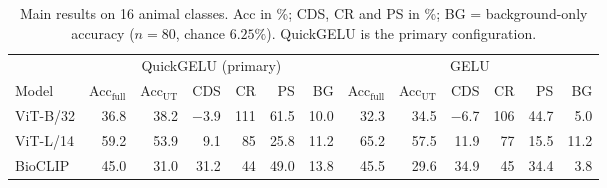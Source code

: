 \begin{table}[t]
\caption{Main results on 16 animal classes. Acc in \%; CDS, CR and PS in \%; BG = background-only accuracy ($n{=}80$, chance $6.25\%$). QuickGELU is the primary configuration.}
\label{tab:main}
\centering\footnotesize
\setlength{\tabcolsep}{4pt}
\begin{tabular}{l rrrrrr rrrrrr}
\toprule
 & \multicolumn{6}{c}{QuickGELU (primary)} & \multicolumn{6}{c}{GELU}\\
\cmidrule(lr){2-7}\cmidrule(lr){8-13}
Model & Acc$_\text{full}$ & Acc$_\text{UT}$ & CDS & CR & PS & BG & Acc$_\text{full}$ & Acc$_\text{UT}$ & CDS & CR & PS & BG \\
\midrule
ViT-B/32 & 36.8 & 38.2 & $-$3.9 & 111 & 61.5 & 10.0 & 32.3 & 34.5 & $-$6.7 & 106 & 44.7 & 5.0 \\
ViT-L/14 & 59.2 & 53.9 & 9.1 & 85 & 25.8 & 11.2 & 65.2 & 57.5 & 11.9 & 77 & 15.5 & 11.2 \\
BioCLIP & 45.0 & 31.0 & 31.2 & 44 & 49.0 & 13.8 & 45.5 & 29.6 & 34.9 & 45 & 34.4 & 3.8 \\
\bottomrule
\end{tabular}
\end{table}
